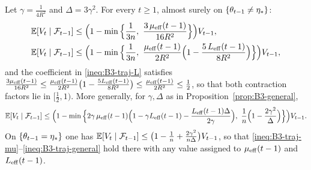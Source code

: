 \begin{proposition}\label{prop:B3-traj}
Let $\gamma=\frac1{4R^2}$ and $\Delta=3\gamma^2$. For every $t\ge1$, almost surely on $\{\theta_{t-1}\ne\eta_\ast\}$:
\begin{align}
\E[V_t\mid\mathcal F_{t-1}]&\le\Big(1-\min\Big\{\frac1{3n},\ \frac{3\,\muEff(t-1)}{16R^2}\Big\}\Big)V_{t-1},\label{ineq:B3-traj-mu}\\
\E[V_t\mid\mathcal F_{t-1}]&\le\Big(1-\min\Big\{\frac1{3n},\ \frac{\muEff(t-1)}{2R^2}\Big(1-\frac{5\,\LEff(t-1)}{8R^2}\Big)\Big\}\Big)V_{t-1},\label{ineq:B3-traj-L}
\end{align}
and the coefficient in \eqref{ineq:B3-traj-L} satisfies $\frac{3\mu_{\mathrm{eff}}(t-1)}{16R^2}\le\frac{\mu_{\mathrm{eff}}(t-1)}{2R^2}\big(1-\frac{5L_{\mathrm{eff}}(t-1)}{8R^2}\big)\le\frac{\mu_{\mathrm{eff}}(t-1)}{2R^2}\le\frac12$, so that both contraction factors lie in $[\frac12,1)$. More generally, for $\gamma,\Delta$ as in Proposition~\ref{prop:B3-general},
\begin{equation}\label{ineq:B3-traj-general}
\E[V_t\mid\mathcal F_{t-1}]\le\Big(1-\min\Big\{2\gamma\,\muEff(t-1)\Big(1-\gamma\LEff(t-1)-\frac{\LEff(t-1)\Delta}{2\gamma}\Big),\ \frac1n\Big(1-\frac{2\gamma^2}{\Delta}\Big)\Big\}\Big)V_{t-1}.
\end{equation}
On $\{\theta_{t-1}=\eta_\ast\}$ one has $\mathbb{E}[V_t\mid\mathcal F_{t-1}]\le\big(1-\frac1n+\frac{2\gamma^2}{n\Delta}\big)V_{t-1}$, so that \eqref{ineq:B3-traj-mu}--\eqref{ineq:B3-traj-general} hold there with any value assigned to $\mu_{\mathrm{eff}}(t-1)$ and $L_{\mathrm{eff}}(t-1)$.
\end{proposition}
